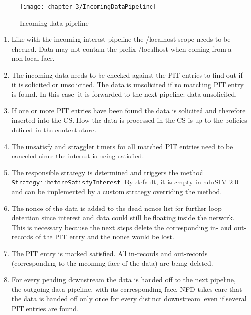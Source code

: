 \vspace{5mm} %

\begin{figure}[H]
  \centering
  \texttt{[image: chapter-3/IncomingDataPipeline]}
  \caption{Incoming data pipeline \cite{Afanasyev16}}
  \label{fig:IncomingDataPipeline}
\end{figure}

\vspace{5mm} %

\begin{enumerate}
\item Like with the incoming interest pipeline the /localhost scope needs to be checked. Data may not contain the prefix /localhost when coming from a non-local face.
\item The incoming data needs to be checked against the PIT entries to find out if it is solicited or unsolicited. The data is unsolicited if no matching PIT entry is found. In this case, it is forwarded to the next pipeline: data unsolicited.
\item If one or more PIT entries have been found the data is solicited and therefore inserted into the CS. How the data is processed in the CS is up to the policies defined in the content store.
\item The unsatisfy and straggler timers for all matched PIT entries need to be canceled since the interest is being satisfied.
\item The responsible strategy is determined and triggers the method \texttt{Strategy::beforeSatisfyInterest}. By default, it is empty in ndnSIM 2.0 and can be implemented by a custom strategy overriding the method.
\item The nonce of the data is added to the dead nonce list for further loop detection since interest and data could still be floating inside the network. This is necessary because the next steps delete the corresponding in- and out-records of the PIT entry and the nonce would be lost. 
\item The PIT entry is marked satisfied. All in-records and out-records (corresponding to the incoming face of the data) are being deleted.
\item For every pending downstream the data is handed off to the next pipeline, the outgoing data pipeline, with its corresponding face. NFD takes care that the data is handed off only once for every distinct downstream, even if several PIT entries are found.
\end{enumerate}

